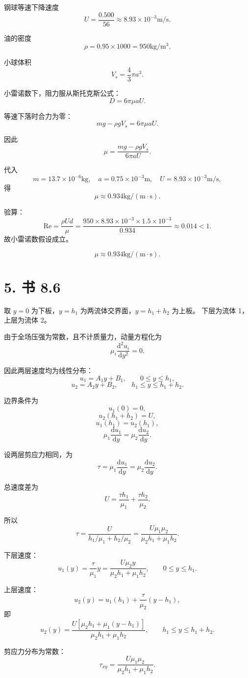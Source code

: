 ﻿\documentclass[12pt,a4paper]{ctexart}
\newcommand{\Rey}{\mathrm{Re}}
\newcommand{\dd}{\mathrm d}
\begin{document}
钢球等速下降速度
\[
U=\frac{0.500}{56}
\approx8.93\times10^{-3}\mathrm{m/s}.
\]

油的密度
\[
\rho=0.95\times1000=950\mathrm{kg/m^3}.
\]

小球体积
\[
V_s=\frac43\pi a^3.
\]

小雷诺数下，阻力服从斯托克斯公式：
\[
D=6\pi\mu aU.
\]

等速下落时合力为零：
\[
mg-\rho gV_s=6\pi\mu aU.
\]

因此
\[
\mu=\frac{mg-\rho gV_s}{6\pi aU}.
\]

代入
\[
m=13.7\times10^{-6}\mathrm{kg},\quad
a=0.75\times10^{-3}\mathrm m,\quad
U=8.93\times10^{-3}\mathrm{m/s},
\]
得
\[
\mu\approx0.934\mathrm{kg/(m\cdot s)}.
\]

验算：
\[
\Rey=\frac{\rho Ud}{\mu}
=\frac{950\times8.93\times10^{-3}\times1.5\times10^{-3}}{0.934}
\approx0.014<1.
\]
故小雷诺数假设成立。

\[
\boxed{\mu\approx0.934\mathrm{kg/(m\cdot s)}}.
\]

\section*{5. 书 8.6}

取 \(y=0\) 为下板，\(y=h_1\) 为两流体交界面，\(y=h_1+h_2\) 为上板。
下层为流体 1，上层为流体 2。

由于全场压强为常数，且不计质量力，动量方程化为
\[
\mu_i\frac{\dd^2u_i}{\dd y^2}=0.
\]

因此两层速度均为线性分布：
\[
u_1=A_1y+B_1,\qquad 0\le y\le h_1,
\]
\[
u_2=A_2y+B_2,\qquad h_1\le y\le h_1+h_2.
\]

边界条件为
\[
u_1(0)=0,
\]
\[
u_2(h_1+h_2)=U,
\]
\[
u_1(h_1)=u_2(h_1),
\]
\[
\mu_1\frac{\dd u_1}{\dd y}
=
\mu_2\frac{\dd u_2}{\dd y}.
\]

设两层剪应力相同，为
\[
\tau=\mu_1\frac{\dd u_1}{\dd y}
=\mu_2\frac{\dd u_2}{\dd y}.
\]

总速度差为
\[
U=\frac{\tau h_1}{\mu_1}+\frac{\tau h_2}{\mu_2}.
\]

所以
\[
\tau=
\frac{U}{h_1/\mu_1+h_2/\mu_2}
=\frac{U\mu_1\mu_2}{\mu_2h_1+\mu_1h_2}.
\]

下层速度：
\[
u_1(y)=\frac{\tau}{\mu_1}y
=
\frac{U\mu_2 y}{\mu_2h_1+\mu_1h_2},
\qquad 0\le y\le h_1.
\]

上层速度：
\[
u_2(y)=u_1(h_1)+\frac{\tau}{\mu_2}(y-h_1),
\]
即
\[
u_2(y)
=
\frac{U\left[\mu_2h_1+\mu_1(y-h_1)\right]}
{\mu_2h_1+\mu_1h_2},
\qquad h_1\le y\le h_1+h_2.
\]

剪应力分布为常数：
\[
\boxed{
\tau_{xy}=
\frac{U\mu_1\mu_2}{\mu_2h_1+\mu_1h_2}
}.
\]
\end{document}
